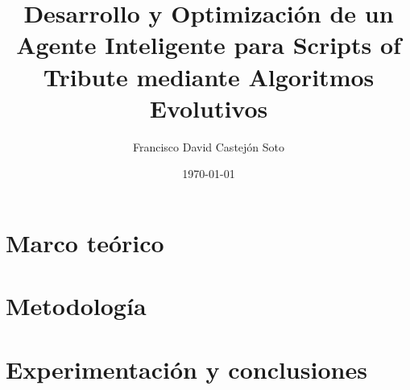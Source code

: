 \documentclass[11pt, a4paper]{book}
\author{Francisco David Castejón Soto}
\title{Desarrollo y Optimización de un Agente Inteligente para Scripts of Tribute mediante Algoritmos Evolutivos}
\date{\today}
\begin{document}
\frontmatter






\cleardoublepage
\tableofcontents

\cleardoublepage
\listoffigures

\cleardoublepage
\listoftables

\mainmatter

\part{Marco teórico} \label{part:idea}






\part{Metodología} \label{part:preparacion}



\part{Experimentación y conclusiones} \label{part:resultados}




\backmatter

\cleardoublepage



% 
\end{document}
